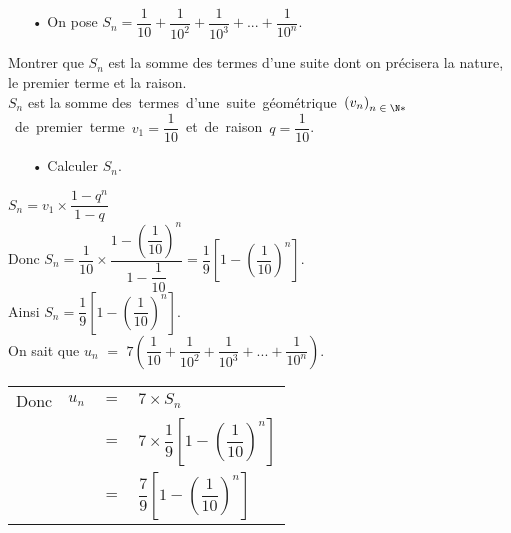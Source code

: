 \vspace*{-5cm}

\newpage

\vspace*{-1cm}

\begin{itemize}
\item[•] On pose $S_n = \dfrac{1}{10} + \dfrac{1}{10^2} + \dfrac{1}{10^3} + ... + \dfrac{1}{10^n}$. \\
\end{itemize}

Montrer que $S_n$ est la somme des termes d'une suite dont on précisera la nature, le premier terme et la raison. \\

$S_n$ est la somme \hbox{des termes d'une suite géométrique $\left(v_n\right)_{n \; \in \; \N*}$ de premier terme $v_1 = \dfrac{1}{10}$ et de raison $q = \dfrac{1}{10}$.} \\

\begin{itemize}
\item[•] Calculer $S_n$. \\
\end{itemize}

$S_n = v_1 \times \dfrac{1 - q^n}{1-q}$ \\

Donc $S_n = \dfrac{1}{10} \times \dfrac{1-\left(\dfrac{1}{10}\right)^n}{1-\dfrac{1}{10}} = \dfrac{1}{9} \left[1-\left(\dfrac{1}{10}\right)^n\right]$. \vspace*{.3cm} \\

Ainsi $S_n = \dfrac{1}{9}\left[1-\left(\dfrac{1}{10}\right)^n\right]$. \vspace*{.3cm} \\

On sait que $u_n$ $=$ $7\left(\dfrac{1}{10} + \dfrac{1}{10^2} + \dfrac{1}{10^3} + ... + \dfrac{1}{10^n}\right)$. \vspace*{.3cm} \\

\begin{tabular}{llll}
Donc & $u_n$ & $=$ & $7 \times S_n$ \vspace*{.3cm} \\
& & $=$ & $7 \times \dfrac{1}{9}\left[1-\left(\dfrac{1}{10}\right)^n\right]$ \vspace*{.3cm} \\
& & $=$ & $\dfrac{7}{9}\left[1-\left(\dfrac{1}{10}\right)^n\right]$ \vspace*{.3cm} \\
\end{tabular}

